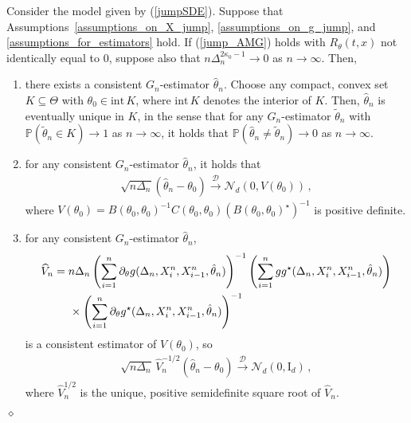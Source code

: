 \documentclass[11pt,a4paper]{article}
\newcommand{\xtl}{{X^n_{i-1}}}
\newcommand{\xtr}{X^n_i}
\newcommand{\thetan}{{\theta_0}}
\newcommand{\PP}{{\mathbb P}}
\newcommand{\dd}{{\mathcal{D}}}
\newcommand{\nn}{{\mathcal{N}}}
\newcommand{\dqed}{{\leavevmode \unskip \penalty9999 \hbox{} \nobreak \hfill \quad \hbox{$\diamond$}}}
\numberwithin{equation}{section}
\numberwithin{theorem}{section}
\begin{document}
\begin{theorem}
Consider the model given by (\ref{jumpSDE}). Suppose that Assumptions~\ref{assumptions_on_X_jump}, \ref{assumptions_on_g_jump}, and \ref{assumptions_for_estimators} hold. If (\ref{jump_AMG}) holds with $R_\theta(t,x)$ not identically equal to $0$, suppose also that $n\Delta_n^{2{\kappa_0}-1} \to 0$ as $n\to \infty$. Then,
\begin{enumerate}[label=(\roman{*}), ref=(\roman{*})]
\item \label{main2} there exists a consistent $G_n$-estimator $\hat{\theta}_n$. Choose any compact, convex set $K\subseteq \Theta$ with $\theta_0 \in \text{int}\, K$, where $\text{int}\, K$ denotes the interior of $K$. Then, $\hat{\theta}_n$ is eventually unique in $K$, in the sense that for any $G_n$-estimator $\tilde{\theta}_n$ with $\PP(\tilde{\theta}_n \in K) \to 1$ as $n\to \infty$, it holds that $\PP(\hat{\theta}_n\neq\tilde{\theta}_n) \to 0$ as $n\to \infty$.
\item \label{main3} for any consistent $G_n$-estimator $\hat{\theta}_n$, it holds that
\begin{align*}
\sqrt{n\Delta_n}( \hat{\theta}_n - \theta_0) \overset{\dd}{\longrightarrow} \nn_d(0,V(\theta_0))\,,
\end{align*}
%
where $V(\theta_0) = B(\thetan, \thetan)^{-1}C(\thetan,\thetan)(B(\thetan,\thetan)^\star )^{-1}$ is positive definite.
\item \label{main4} for any consistent $G_n$-estimator $\hat{\theta}_n$,
\begin{align*}
\begin{split}
\widehat{V}_n &= n\Delta_n\left( \sum_{i=1}^n \partial_\theta g(\Delta_n, \xtr,\xtl, \hat{\theta}_n)\right)^{-1}\left(\sum_{i=1}^n gg^\star (\Delta_n, \xtr,\xtl,\hat{\theta}_n)\right)\\
&\hspace{5mm} \times \left( \sum_{i=1}^n \partial_\theta g^\star  (\Delta_n, \xtr,\xtl,\hat{\theta}_n)\right)^{-1}
\end{split}
\end{align*}
is a consistent estimator of $V(\theta_0)$, so
\begin{align*}
\sqrt{n\Delta_n} \,\widehat{V}_n^{-1/2} ( \hat{\theta}_n - \theta_0) \overset{\dd}{\longrightarrow} \nn_d(0,\text{I}_d)\,,
\end{align*}
where $\widehat{V}_n^{1/2}$ is the unique, positive semidefinite square root of $\widehat{V}_n$.
\end{enumerate}\dqed
\label{maintheo}
\end{theorem}
\end{document}
